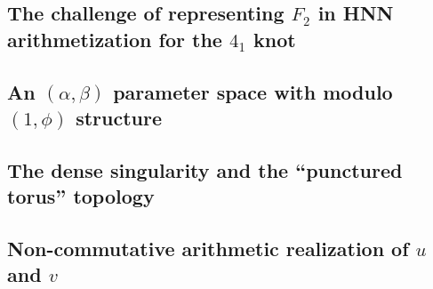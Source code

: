 
\subsection{The challenge of representing $F_2$ in HNN arithmetization for the $4_1$ knot}
\label{sec:hnn_f2_challenge}

\subsection{An $(\alpha, \beta)$ parameter space with modulo $(1, \phi)$ structure}
\label{sec:alpha_beta_space_modulo}

\subsection{The dense singularity and the ``punctured torus'' topology}
\label{sec:dense_singularity_topology}

\subsection{Non-commutative arithmetic realization of $u$ and $v$}
\label{sec:non_commutative_uv_R2}


